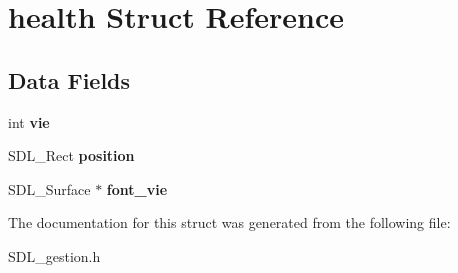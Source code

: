 \hypertarget{structhealth}{}\section{health Struct Reference}
\label{structhealth}
\subsection*{Data Fields}
\begin{DoxyCompactItemize}
\item 
\mbox{\label{structhealth_a36996f3ec647d394ac9eb41eed3d2f63}} 
int {\bfseries vie}
\item 
\mbox{\label{structhealth_a08a6de67cbfb3165638a53258fad3a57}} 
S\+D\+L\+\_\+\+Rect {\bfseries position}
\item 
\mbox{\label{structhealth_a243fe344f539db773eed5a8c5d0e62a1}} 
S\+D\+L\+\_\+\+Surface $\ast$ {\bfseries font\+\_\+vie}
\end{DoxyCompactItemize}


The documentation for this struct was generated from the following file\+:\begin{DoxyCompactItemize}
\item 
S\+D\+L\+\_\+gestion.\+h\end{DoxyCompactItemize}
